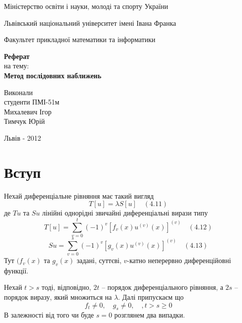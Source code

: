 \documentclass[12pt,a4paper]{article}
\begin{document}

\setlength{\parindent}{1.5cm}
\fontsize{14pt}{6mm}\selectfont

\begin{center}
  Міністерство освіти і науки, молоді та спорту України
  
  Львівський національний університет імені Івана Франка

  Факультет прикладної математики та інформатики
\end{center}


\vspace{6cm}

\begin{center}
  {\bfseries\Large Реферат}\\[0.5cm]
  на тему:\\[0.5cm]
  {\bfseries\Large Метод послідовних наближень}\\
\end{center}

\vspace{2cm}

\begin{flushleft}
  Виконали\\
  студенти ПМІ-51м\\
  Михалевич Ігор\\
  Тимчук Юрій
\end{flushleft}

\vspace{6cm}

\begin{center}
  Львів - 2012 
\end{center}

\clearpage

\fontsize{14pt}{6mm}\selectfont

\section{Вступ}

Нехай диференціальне рівняння має такий вигляд
\[
T[u] = \lambda S[u]   \quad (4.11)
\]
де $Tu$ та $Su$ лінійні однорідні звичайні диференціальні вирази типу
\[
T[u] = \sum_{v=0}^t(-1)^v[f_v(x)u^{(v)}(x)]^{(v)}   \quad (4.12)
\]
\[
Su = \sum_{v=0}^s(-1)^v[g_v(x)u^{(v)}(x)]^{(v)}   \quad (4.13)
\]
Тут $(f_v(x)$ та $g_v(x)$ задані, суттєві, $v$-катно неперервно диференційовні функції. 

Нехай $t>s$ тоді, відповідно, $2t$ -- порядок диференціального рівняння, а $2s$ -- порядок виразу, який множиться на $\lambda$. Далі припускаєм що
\[
f_t \not= 0, \quad g_s \not= 0, \quad, t>s\ge0
\]
В залежності від того чи буде $s=0$ розглянем два випадки.
\end{document}
